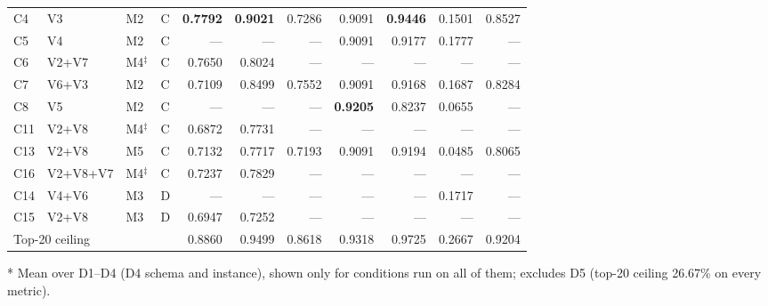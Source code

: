 \begin{table}[t]
\begin{threeparttable}
\begin{tabular}{llllrrrrrrr}
\hline
C4 & V3 & M2 & C & \textbf{0.7792} & \textbf{0.9021} & 0.7286 & 0.9091 & \textbf{0.9446} & 0.1501 & 0.8527 \\
C5 & V4 & M2 & C & --- & --- & --- & 0.9091 & 0.9177 & 0.1777 & --- \\
C6 & V2+V7 & M4$^\ddagger$ & C & 0.7650 & 0.8024 & --- & --- & --- & --- & --- \\
C7 & V6+V3 & M2 & C & 0.7109 & 0.8499 & 0.7552 & 0.9091 & 0.9168 & 0.1687 & 0.8284 \\
C8 & V5 & M2 & C & --- & --- & --- & \textbf{0.9205} & 0.8237 & 0.0655 & --- \\
C11 & V2+V8 & M4$^\ddagger$ & C & 0.6872 & 0.7731 & --- & --- & --- & --- & --- \\
C13 & V2+V8 & M5 & C & 0.7132 & 0.7717 & 0.7193 & 0.9091 & 0.9194 & 0.0485 & 0.8065 \\
C16 & V2+V8+V7 & M4$^\ddagger$ & C & 0.7237 & 0.7829 & --- & --- & --- & --- & --- \\
\hline
C14 & V4+V6 & M3 & D & --- & --- & --- & --- & --- & 0.1717 & --- \\
C15 & V2+V8 & M3 & D & 0.6947 & 0.7252 & --- & --- & --- & --- & --- \\
\hline
\multicolumn{4}{l}{Top-20 ceiling} & 0.8860 & 0.9499 & 0.8618 & 0.9318 & 0.9725 & 0.2667 & 0.9204 \\
\hline
\end{tabular}
\begin{tablenotes}
\item[*] Mean over D1--D4 (D4 schema and instance), shown only for conditions run on all of them; excludes D5 (top-20 ceiling 26.67\% on every metric).
\end{tablenotes}
\end{threeparttable}
\end{table}
